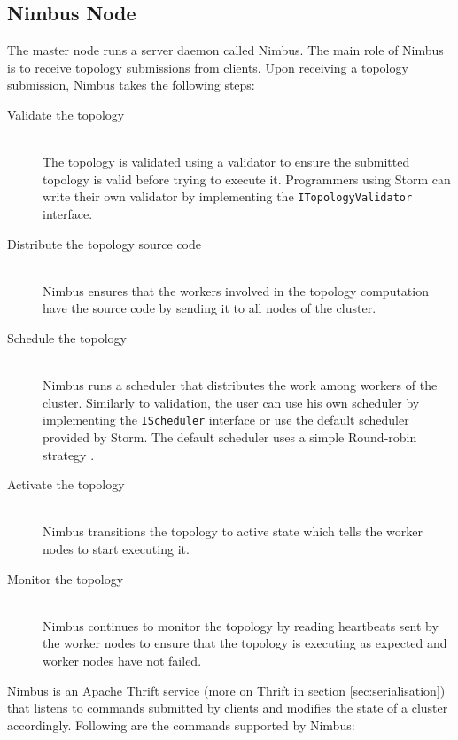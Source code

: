 \documentclass[bsc,deptreport,twoside,singlespacing,normalheadings,parskip]{infthesis}\usepackage[]{graphicx}\usepackage[]{color}
\begin{document}
\subsection{Nimbus Node}

The master node runs a server daemon called Nimbus. The main role of Nimbus is to receive topology submissions from clients. Upon receiving a topology submission, Nimbus takes the following steps:

\begin{description}
	\item[Validate the topology] \hfill \\
	The topology is validated using a validator to ensure the submitted topology is valid before trying to execute it. Programmers using Storm can write their own validator by implementing the \texttt{ITopologyValidator} interface.
	\item[Distribute the topology source code] \hfill \\
	Nimbus ensures that the workers involved in the topology computation have the source code by sending it to all nodes of the cluster.
	\item[Schedule the topology] \hfill \\
	Nimbus runs a scheduler that distributes the work among workers of the cluster. Similarly to validation, the user can use his own scheduler by implementing the \texttt{IScheduler} interface or use the default scheduler provided by Storm. The default scheduler uses a simple Round-robin strategy \citep{Aniello_Baldoni_Querzoni_2013}.
	\item[Activate the topology] \hfill \\
	Nimbus transitions the topology to active state which tells the worker nodes to start executing it.
	\item[Monitor the topology] \hfill \\
	Nimbus continues to monitor the topology by reading heartbeats sent by the worker nodes to ensure that the topology is executing as expected and worker nodes have not failed.
\end{description}


Nimbus is an Apache Thrift \cite{ApacheThrift} service (more on Thrift in section \ref{sec:serialisation}) that listens to commands submitted by clients and modifies the state of a cluster accordingly. Following are the commands supported by Nimbus:
\end{document}
